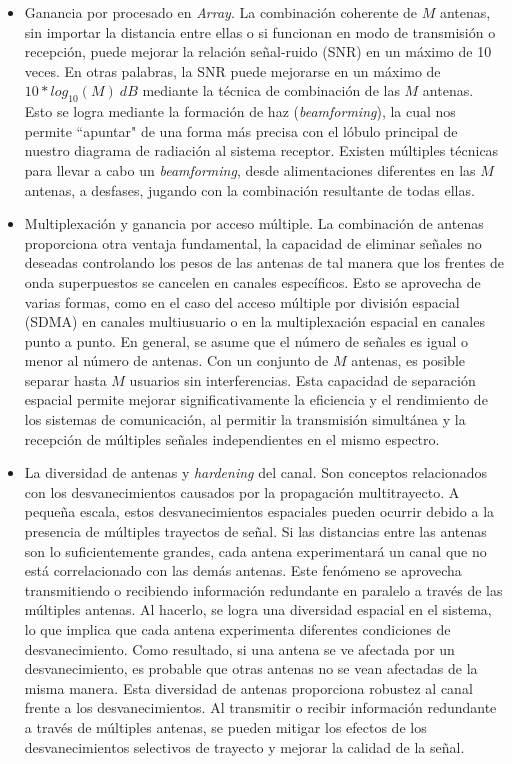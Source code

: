 \begin{itemize}
    \item Ganancia por procesado en \textit{Array}. La combinación coherente de $M$ antenas, sin importar la distancia entre ellas o si funcionan en modo de transmisión o recepción, puede mejorar la relación señal-ruido (SNR) en un máximo de 10 veces. En otras palabras, la SNR puede mejorarse en un máximo de $10*log_{10}(M)\:dB$ mediante la técnica de combinación de las $M$ antenas. Esto se logra mediante la formación de haz (\textit{beamforming}), la cual nos permite ``apuntar" de una forma más precisa con el lóbulo principal de nuestro diagrama de radiación al sistema receptor. Existen múltiples técnicas para llevar a cabo un \textit{beamforming}, desde alimentaciones diferentes en las $M$ antenas, a desfases, jugando con la combinación resultante de todas ellas.

    \item Multiplexación y ganancia por acceso múltiple. La combinación de antenas proporciona otra ventaja fundamental, la capacidad de eliminar señales no deseadas controlando los pesos de las antenas de tal manera que los frentes de onda superpuestos se cancelen en canales específicos. Esto se aprovecha de varias formas, como en el caso del acceso múltiple por división espacial (SDMA) en canales multiusuario o en la multiplexación espacial en canales punto a punto. En general, se asume que el número de señales es igual o menor al número de antenas. Con un conjunto de $M$ antenas, es posible separar hasta $M$ usuarios sin interferencias. Esta capacidad de separación espacial permite mejorar significativamente la eficiencia y el rendimiento de los sistemas de comunicación, al permitir la transmisión simultánea y la recepción de múltiples señales independientes en el mismo espectro.

    \item   La diversidad de antenas y \textit{hardening} del canal. Son conceptos relacionados con los desvanecimientos causados por la propagación multitrayecto. A pequeña escala, estos desvanecimientos espaciales pueden ocurrir debido a la presencia de múltiples trayectos de señal. Si las distancias entre las antenas son lo suficientemente grandes, cada antena experimentará un canal que no está correlacionado con las demás antenas. Este fenómeno se aprovecha transmitiendo o recibiendo información redundante en paralelo a través de las múltiples antenas. Al hacerlo, se logra una diversidad espacial en el sistema, lo que implica que cada antena experimenta diferentes condiciones de desvanecimiento. Como resultado, si una antena se ve afectada por un desvanecimiento, es probable que otras antenas no se vean afectadas de la misma manera. Esta diversidad de antenas proporciona robustez al canal frente a los desvanecimientos. Al transmitir o recibir información redundante a través de múltiples antenas, se pueden mitigar los efectos de los desvanecimientos selectivos de trayecto y mejorar la calidad de la señal.
\end{itemize}

